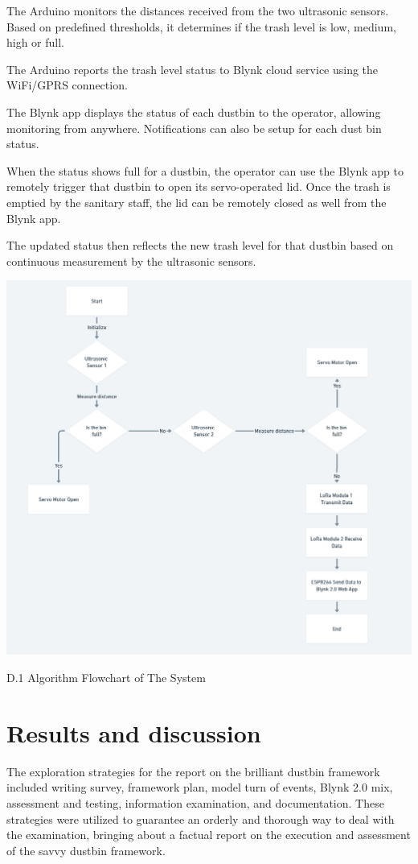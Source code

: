 \documentclass[conference, onecolumn]{IEEEtran}
\begin{document}
The Arduino monitors the distances received from the two ultrasonic sensors. Based on predefined thresholds, it determines if the trash level is low, medium, high or full.

The Arduino reports the trash level status to Blynk cloud service using the WiFi/GPRS connection.

The Blynk app displays the status of each dustbin to the operator, allowing monitoring from anywhere. Notifications can also be setup for each dust bin status.

When the status shows full for a dustbin, the operator can use the Blynk app to remotely trigger that dustbin to open its servo-operated lid.
Once the trash is emptied by the sanitary staff, the lid can be remotely closed as well from the Blynk app.

The updated status then reflects the new trash level for that dustbin based on continuous measurement by the ultrasonic sensors.\\

\begin{center}
\centerline{\includegraphics[width=3.8 in]{flowchart.png}}
D.1 Algorithm Flowchart of The System
\end{center}

\section{Results and discussion}
The exploration strategies for the report on the brilliant dustbin framework included writing survey, framework plan, model turn of events, Blynk 2.0 mix, assessment and testing, information examination, and documentation. These strategies were utilized to guarantee an orderly and thorough way to deal with the examination, bringing about a factual report on the execution and assessment of the savvy dustbin framework.\\
\end{document}
